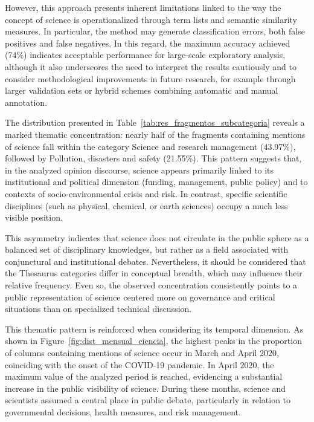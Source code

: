 \documentclass[pdflatex,sn-mathphys-num, iicol]{sn-jnl}
\begin{document}
	
	However, this approach presents inherent limitations linked to the way the concept of science is operationalized through term lists and semantic similarity measures. In particular, the method may generate classification errors, both false positives and false negatives. In this regard, the maximum accuracy achieved (74\%) indicates acceptable performance for large-scale exploratory analysis, although it also underscores the need to interpret the results cautiously and to consider methodological improvements in future research, for example through larger validation sets or hybrid schemes combining automatic and manual annotation.
	
	
	The distribution presented in Table~\ref{tab:res_fragmentos_subcategoria} reveals a marked thematic concentration: nearly half of the fragments containing mentions of science fall within the category Science and research management (43.97\%), followed by Pollution, disasters and safety (21.55\%). This pattern suggests that, in the analyzed opinion discourse, science appears primarily linked to its institutional and political dimension (funding, management, public policy) and to contexts of socio-environmental crisis and risk. In contrast, specific scientific disciplines (such as physical, chemical, or earth sciences) occupy a much less visible position.
	
	
	This asymmetry indicates that science does not circulate in the public sphere as a balanced set of disciplinary knowledges, but rather as a field associated with conjunctural and institutional debates. Nevertheless, it should be considered that the Thesaurus categories differ in conceptual breadth, which may influence their relative frequency. Even so, the observed concentration consistently points to a public representation of science centered more on governance and critical situations than on specialized technical discussion.
	
	This thematic pattern is reinforced when considering its temporal dimension. As shown in Figure~\ref{fig:dist_mensual_ciencia}, the highest peaks in the proportion of columns containing mentions of science occur in March and April 2020, coinciding with the onset of the COVID-19 pandemic. In April 2020, the maximum value of the analyzed period is reached, evidencing a substantial increase in the public visibility of science. During these months, science and scientists assumed a central place in public debate, particularly in relation to governmental decisions, health measures, and risk management.
	
\end{document}
